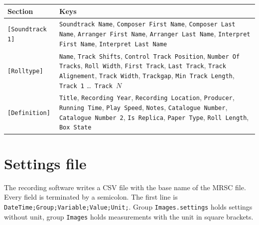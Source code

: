 \documentclass[11pt, a4paper]{article}
\newcommand{\code}[1]{\texttt{#1}}
\newenvironment{block}
  {\par\medskip\noindent\begin{minipage}{\textwidth}\centering}
  {\end{minipage}\par\medskip}
\begin{document}
\begin{block}
\begin{tabularx}{\textwidth}{@{}lL@{}}
\toprule
Section & Keys \\
\midrule
\code{[Soundtrack 1]} & \code{Soundtrack Name}, \code{Composer First Name}, \code{Composer Last Name}, \code{Arranger First Name}, \code{Arranger Last Name}, \code{Interpret First Name}, \code{Interpret Last Name} \\
\addlinespace
\code{[Rolltype]} & \code{Name}, \code{Track Shifts}, \code{Control Track Position}, \code{Number Of Tracks}, \code{Roll Width}, \code{First Track}, \code{Last Track}, \code{Track Alignement}, \code{Track Width}, \code{Trackgap}, \code{Min Track Length}, \code{Track 1} \dots\ \code{Track }$N$ \\
\addlinespace
\code{[Definition]} & \code{Title}, \code{Recording Year}, \code{Recording Location}, \code{Producer}, \code{Running Time}, \code{Play Speed}, \code{Notes}, \code{Catalogue Number}, \code{Catalogue Number 2}, \code{Is Replica}, \code{Paper Type}, \code{Roll Length}, \code{Box State} \\
\bottomrule
\end{tabularx}
\label{tab:trailer}
\end{block}

\section{Settings file}

The recording software writes a CSV file with the base name of the MRSC file.
Every field is terminated by a semicolon. The first line is \code{DateTime;Group;Variable;Value;Unit;}.
Group \code{Images.settings} holds settings without unit, group \code{Images} holds measurements with the unit in square brackets.
\end{document}
